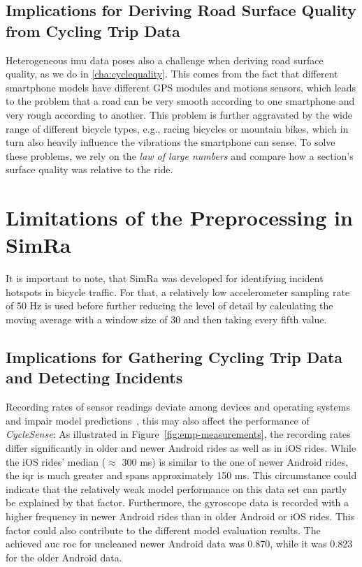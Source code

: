 \subsection*{Implications for Deriving Road Surface Quality from Cycling Trip Data}
Heterogeneous \ac{imu} data poses also a challenge when deriving road surface quality, as we do in \cref{cha:cyclequality}.
This comes from the fact that different smartphone models have different GPS modules and motions sensors, which leads to the problem that a road can be very smooth according to one smartphone and very rough according to another.
This problem is further aggravated by the wide range of different bicycle types, e.g., racing bicycles or mountain bikes, which in turn also heavily influence the vibrations the smartphone can sense.
To solve these problems, we rely on the \textit{law of large numbers} and compare how a section's surface quality was relative to the ride. 

\section{Limitations of the Preprocessing in SimRa}
It is important to note, that SimRa was developed for identifying incident hotspots in bicycle traffic.
For that, a relatively low accelerometer sampling rate of 50 Hz is used before further reducing the level of detail by calculating the moving average with a window size of 30 and then taking every fifth value.

\subsection*{Implications for Gathering Cycling Trip Data and Detecting Incidents}
Recording rates of sensor readings deviate among devices and operating systems and impair model predictions~\cite{stisen2015smart}, this may also affect the performance of \textit{CycleSense}:
As illustrated in Figure~\ref{fig:emp-measurements}, the recording rates differ significantly in older and newer Android rides as well as in iOS rides.
While the iOS rides' median ($\approx$ 300 ms) is similar to the one of newer Android rides, the \ac{iqr} is much greater and spans approximately 150 ms.
This circumstance could indicate that the relatively weak model performance on this data set can partly be explained by that factor. 
Furthermore, the gyroscope data is recorded with a higher frequency in newer Android rides than in older Android or iOS rides.
This factor could also contribute to the different model evaluation results. 
The achieved \ac{auc} \ac{roc} for uncleaned newer Android data was 0.870, while it was 0.823 for the older Android data.


